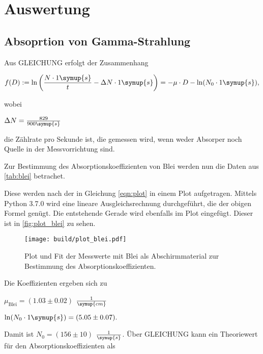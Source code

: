 \section{Auswertung}
\label{sec:Auswertung}

\subsection{Absoprtion von Gamma-Strahlung}

Aus GLEICHUNG erfolgt der Zusammenhang

\begin{equation}
    \label{eqn:plot}
    f(D) := \ln \bigg (\frac{ N \cdot 1 \symup{s}}{t} - \Delta N \cdot 1 \symup{s} \bigg) = - \mu \cdot D - \ln (N_0 \cdot 1 \symup{s}),
\end{equation}

wobei

\begin{center}
    $\Delta N = \frac{829}{900 \symup{s}}$
\end{center}

die Zählrate pro Sekunde ist, die gemessen wird, wenn weder Absorper noch Quelle in der Messvorrichtung sind.

Zur Bestimmung des Absorptionskoeffizienten von Blei werden nun die Daten aus \autoref{tab:blei} betrachet.



Diese werden nach der in Gleichung \eqref{eqn:plot} in einem Plot aufgetragen.
Mittels Python 3.7.0 wird eine lineare Ausgleichsrechnung durchgeführt, die der obigen Formel genügt.
Die entstehende Gerade wird ebenfalls im Plot eingefügt.
Dieser ist in \autoref{fig:plot_blei} zu sehen.

\begin{figure}
    \centering
    \texttt{[image: build/plot\_blei.pdf]}
    \caption{Plot und Fit der Messwerte mit Blei als Abschirmmaterial zur Bestimmung des Absorptionskoeffizienten.}
    \label{fig:plot_blei}
\end{figure}

Die Koeffizienten ergeben sich zu 

\begin{center}
    $\mu_\text{Blei} = (1.03 \pm 0.02)$ $\frac{1}{\symup{cm}}$

    $\ln ( N_ 0 \cdot 1 \symup{s}) = (5.05 \pm 0.07).$
\end{center}

Damit ist $N_0 = (156 \pm 10)$ $\frac{1}{\symup{s}}$.
Über GLEICHUNG kann ein Theoriewert für den Absorptionskoeffizienten als

